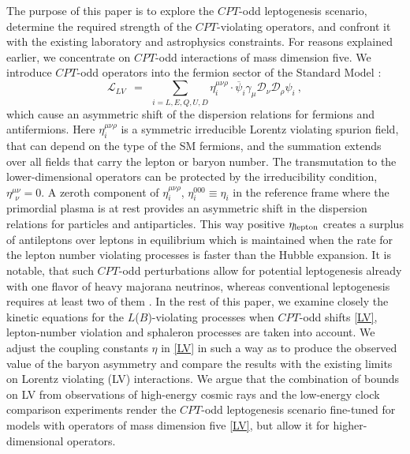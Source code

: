 \documentclass[12pt]{revtex4}
\newcommand{\md}{\mathcal{D}}
\newcommand{\ov}{\overline}
\begin{document}
    
    The purpose of this paper is to explore the $CPT$-odd leptogenesis scenario, 
    determine the required strength of the $CPT$-violating operators, and confront it with the 
    existing laboratory and astrophysics constraints. 
 For reasons explained earlier, we  concentrate on $CPT$-odd interactions of mass dimension five. 
	We introduce $CPT$-odd operators into the fermion sector of the Standard Model
\cite{MP:}:
\begin{equation}
\label{LV}
	\mathcal{L}_{LV} ~~=~~ \sum_{i=L,E,Q,U,D}\eta_i^{\mu\nu\rho}\cdot \ov{\psi}_i\gamma_\mu \md_\nu \md_\rho \psi_i~,
\end{equation}
	which cause an asymmetric shift of the dispersion relations for fermions and antifermions.
	Here $\eta_i^{\mu\nu\rho}$ is a symmetric irreducible Lorentz violating spurion field, that 
	can depend on the type of the SM fermions, and the summation extends over all 
	fields that carry the lepton or baryon number. The transmutation to the lower-dimensional 
	operators can be protected by the irreducibility condition, $\eta^{\mu\nu}_{~~\nu}=0$.
	A zeroth component of $ \eta_i^{\mu\nu\rho} $, $ \eta_i^{000} \equiv \eta_i $ in the 
reference frame where the primordial plasma is at rest provides 
	an asymmetric shift in the dispersion relations for particles and antiparticles.
    This way positive $\eta_{\rm lepton}$ creates a surplus of antileptons over leptons 
    in equilibrium which is maintained when the rate for the
lepton number violating processes is faster than the Hubble expansion.
	It is notable, that such $CPT$-odd perturbations allow for potential leptogenesis already
	with one flavor of heavy majorana neutrinos, whereas conventional leptogenesis requires
	at least two of them \cite{Fukugita:1986hr}.
	In the rest of this paper, we examine closely the kinetic equations for the 
    $L$($B$)-violating processes when $CPT$-odd shifts \eqref{LV}, lepton-number violation and 
    sphaleron processes are taken into account. 
	We adjust the coupling constants $ \eta $ in \eqref{LV} in such a way as to produce 
	the observed value of the baryon asymmetry and compare the results with the existing
	limits on Lorentz violating (LV) interactions. 
	We argue that the combination of bounds on LV from observations of high-energy cosmic rays
\cite{Gagnon:2004xh} and the low-energy clock comparison experiments
render the $CPT$-odd leptogenesis scenario fine-tuned  for models with operators of 
	mass dimension five \eqref{LV}, but allow it for higher-dimensional operators.
	
\end{document}
